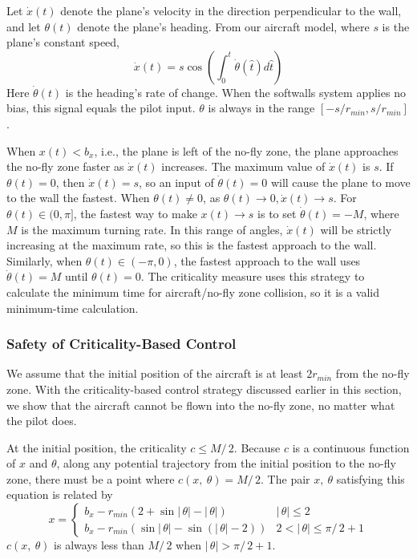 \documentclass[11pt]{article}
\begin{document}
Let $\dot{x}(t)$ denote the plane's velocity in the direction
perpendicular to the wall, and let $\theta(t)$ denote the plane's
heading.  From our aircraft model, where $s$ is the plane's constant
speed,
\[
\dot{x}(t) = s \cos{(\int_{0}^{t}{\dot{\theta}}(\hat{t})d\hat{t})}
\]
Here $\dot{\theta}(t)$ is the heading's rate of change.  When the
softwalls system applies no bias, this signal equals the pilot input.
$\theta$ is always in the range $[-s / r_{min}, s / r_{min}]$.

When $x(t) < b_{x}$, i.e., the plane is left of the no-fly zone, the
plane approaches the no-fly zone faster as $\dot{x}(t)$ increases.
The maximum value of $\dot{x}(t)$ is $s$.  If $\theta(t) = 0$, then
$\dot{x}(t) = s$, so an input of $\dot{\theta}(t) = 0$ will cause the
plane to move to the wall the fastest.  When $\theta(t) \neq 0$, as
$\theta(t) \rightarrow 0, \dot{x}(t) \rightarrow s$.  For $\theta(t)
\in (0,\pi]$, the fastest way to make $x(t) \rightarrow s$ is to set
$\dot{\theta}(t) = -M$, where $M$ is the maximum turning rate.  In
this range of angles, $\dot{x}(t)$ will be strictly increasing at the
maximum rate, so this is the fastest approach to the wall.  Similarly,
when $\theta(t) \in (-\pi, 0)$, the fastest approach to the wall uses
$\dot{\theta}(t) = M$ until $\theta(t) = 0$.  The criticality measure
uses this strategy to calculate the minimum time for aircraft/no-fly
zone collision, so it is a valid minimum-time calculation.

\subsubsection{Safety of Criticality-Based Control}

We assume that the initial position of the aircraft is at least $2r_{min}$ from
the no-fly zone. With the criticality-based control strategy discussed earlier
in this section, we show that the aircraft cannot be flown into the
no-fly zone, no matter what the pilot does.

At the initial position, the criticality $c \leq M/\,2$. Because $c$ is a
continuous function of $x$ and $\theta$, along any potential trajectory from
the initial position to the no-fly zone, there must be a point where
$c(x,\ \theta) = M/\,2$. The pair $x,\ \theta$ satisfying this equation is
related by
\[x = 
\left\{ \begin{array}{ll}
b_x - r_{min}(2 + \sin\!|\,\theta| - |\,\theta|) & |\,\theta| \leq 2 
\\
b_x - r_{min}(\sin\!|\,\theta| - \sin(|\,\theta|-2)) & 2 < |\,\theta| \leq \pi/\,2 + 1
\end{array}
\right.
\]
$c(x,\ \theta)$ is always less than $M/\,2$ when $|\,\theta| > \pi/\,2 + 1$.
\end{document}
